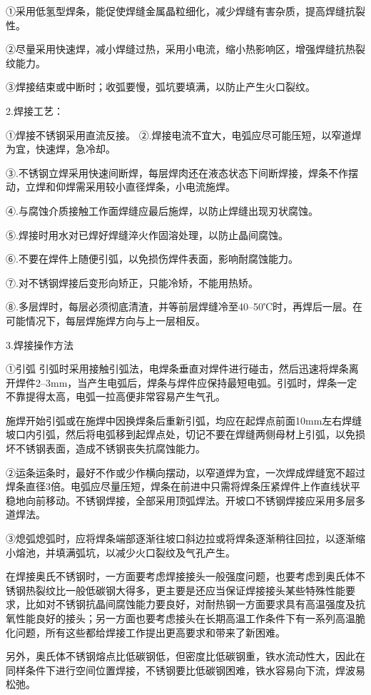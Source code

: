 \documentclass{ctexbook}
\begin{document}
①采用低氢型焊条，能促使焊缝金属晶粒细化，减少焊缝有害杂质，提高焊缝抗裂性。

②尽量采用快速焊，减小焊缝过热，采用小电流，缩小热影响区，增强焊缝抗热裂纹能力。

③焊接结束或中断时；收弧要慢，弧坑要填满，以防止产生火口裂纹。

2.焊接工艺：

①焊接不锈钢采用直流反接。
②.焊接电流不宜大，电弧应尽可能压短，以窄道焊为宜，快速焊，急冷却。

③.不锈钢立焊采用快速间断焊，每层焊肉还在液态状态下间断焊接，焊条不作摆动，立焊和仰焊需采用较小直径焊条，小电流施焊。

④.与腐蚀介质接触工作面焊缝应最后施焊，以防止焊缝出现刃状腐蚀。

⑤.焊接时用水对已焊好焊缝淬火作固溶处理，以防止晶间腐蚀。

⑥.不要在焊件上随便引弧，以免损伤焊件表面，影响耐腐蚀能力。

⑦.对不锈钢焊接后变形向矫正，只能冷矫，不能用热矫。

⑧.多层焊时，每层必须彻底清渣，并等前层焊缝冷至40--50℃时，再焊后一层。在可能情况下，每层焊施焊方向与上一层相反。

3.焊接操作方法

①引弧 引弧时采用接触引弧法，电焊条垂直对焊件进行碰击，然后迅速将焊条离开焊件2--3mm，当产生电弧后，焊条与焊件应保持最短电弧。引弧时，焊条一定不靠提得太高，电弧一拉高便非常容易产生气孔。

施焊开始引弧或在施焊中因换焊条后重新引弧，均应在起焊点前面10mm左右焊缝坡口内引弧，然后将电弧移到起焊点处，切记不要在焊缝两侧母材上引弧，以免损坏不锈钢表面，造成不锈钢丧失抗腐蚀能力。

②运条运条时，最好不作或少作横向摆动，以窄道焊为宜，一次焊成焊缝宽不超过焊条直径3倍。电弧应尽量压短，焊条在前进中只需将焊条压紧焊件上作直线状平稳地向前移动。不锈钢焊接，全部采用顶弧焊法。开坡口不锈钢焊接应采用多层多道焊法。

③熄弧熄弧时，应将焊条端部逐渐往坡口斜边拉或将焊条逐渐稍往回拉，以逐渐缩小熔池，并填满弧坑，以减少火口裂纹及气孔产生。

在焊接奥氏不锈钢时，一方面要考虑焊接接头一般强度问题，也要考虑到奥氏体不锈钢热裂纹比一般低碳钢大得多，更主要是还应当保证焊接接头某些特殊性能要求，比如对不锈钢抗晶间腐蚀能力要良好，对耐热钢一方面要求具有高温强度及抗氧性能良好的接头；另一方面也要考虑接头在长期高温工作条件下有一系列高温脆化问题，所有这些都给焊接工作提出更高要求和带来了新困难。

另外，奥氏体不锈钢熔点比低碳钢低，但密度比低碳钢重，铁水流动性大，因此在同样条件下进行空间位置焊接，不锈钢要比低碳钢困难，铁水容易向下流，焊波易松弛。
\end{document}
